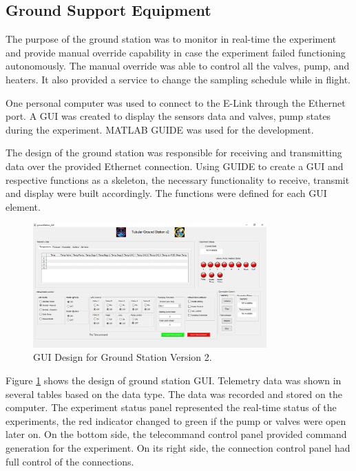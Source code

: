 \pagebreak
\subsection{Ground Support Equipment}\label{sec:4.9}
The purpose of the ground station was to monitor in real-time the experiment and provide manual override capability in case the experiment failed functioning autonomously. The manual override was able to control all the valves, pump, and heaters. It also provided a service to change the sampling schedule while in flight. \par
One personal computer was used to connect to the E-Link through the Ethernet port. A GUI was created to display the sensors data and valves, pump states during the experiment. MATLAB GUIDE was used for the development. \par
The design of the ground station was responsible for receiving and transmitting data over the provided Ethernet connection. Using GUIDE to create a GUI and respective functions as a skeleton, the necessary  functionality to receive, transmit and display were built accordingly. The functions were defined for each GUI element.
\begin{figure}[H]
    \centering
    \includegraphics[width=0.8\textwidth]{4-experiment-design/img/GS-GUI-final.png}
    \caption{GUI Design for Ground Station Version 2.}
    \label{fig:guiDesign}
\end{figure}
Figure \ref{fig:guiDesign} shows the design of ground station GUI. Telemetry data was shown in several tables based on the data type. The data was recorded and stored on the computer. The experiment status panel represented the real-time status of the experiments, the red indicator changed to green if the pump or valves were open later on. On the bottom side, the telecommand control panel provided command generation for the experiment. On its right side, the connection control panel had full control of the connections.


\raggedbottom